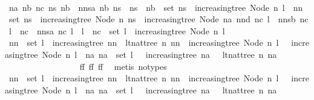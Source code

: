 \begin{isabellebody}
\ \ \ \ \ \ \ \ \ \ \ \ \isamarkupfalse%
\isanewline
\ \ \ \ \ \ \ \ \ \ \ \ \isacommand{{\isacharbraceleft}}\isamarkupfalse%
\ \isamarkupfalse%
\ {\isachardoublequoteopen}{\isasymexists}na\ nb\ nc\ ns{\isachardot}\ nb\ {\isacharhash}\ nnsa\ nb\ ns\ {\isasymnoteq}\ ns\ {\isasymand}\ nb\ {\isasymin}\ set\ ns\ {\isasymand}\ increasing{\isacharunderscore}tree\ {\isacharparenleft}Node\ n\ l{\isacharparenright}\ {\isasymand}\ nn\ {\isasymin}\ set\ ns\ {\isasymand}\ increasing{\isacharunderscore}tree\ {\isacharparenleft}Node\ n\ ns{\isacharparenright}\ {\isasymand}\ increasing{\isacharunderscore}tree\ {\isacharparenleft}Node\ na\ {\isacharparenleft}nnd\ nc\ l\ {\isacharhash}\ nnsb\ nc\ l{\isacharparenright}{\isacharparenright}\ {\isasymand}\ nc\ {\isacharhash}\ nnsa\ nc\ l\ {\isasymnoteq}\ l\ {\isasymand}\ nc\ {\isasymin}\ set\ l\ {\isasymand}\ increasing{\isacharunderscore}tree\ {\isacharparenleft}Node\ n\ l{\isacharparenright}{\isachardoublequoteclose}\isanewline
\ \ \ \ \ \ \ \ \ \ \ \ \ \ \isamarkupfalse%
\ \isamarkupfalse%
\ {\isachardoublequoteopen}{\isacharparenleft}nn\ {\isasymnotin}\ set\ l\ {\isasymor}\ increasing{\isacharunderscore}tree\ nn\ {\isasymand}\ lt{\isacharunderscore}nat{\isacharunderscore}tree\ n\ nn{\isacharparenright}\ {\isasymand}\ increasing{\isacharunderscore}tree\ {\isacharparenleft}Node\ n\ l{\isacharparenright}\ {\isasymor}\ {\isasymnot}\ increasing{\isacharunderscore}tree\ {\isacharparenleft}Node\ n\ l{\isacharparenright}\ {\isasymand}\ {\isacharparenleft}{\isasymexists}na{\isachardot}\ na\ {\isasymin}\ set\ l\ {\isasymand}\ {\isacharparenleft}{\isasymnot}\ increasing{\isacharunderscore}tree\ na\ {\isasymor}\ {\isasymnot}\ lt{\isacharunderscore}nat{\isacharunderscore}tree\ n\ na{\isacharparenright}{\isacharparenright}{\isachardoublequoteclose}\isanewline
\ \ \ \ \ \ \ \ \ \ \ \ \ \ \ \ \isamarkupfalse%
\ ff{}\ ff{}\ ff{}\ \isamarkupfalse%
\ {\isacharparenleft}metis\ {\isacharparenleft}no{\isacharunderscore}types{\isacharparenright}{\isacharparenright}\ \isacommand{{\isacharbraceright}}\isamarkupfalse%
\isanewline
\ \ \ \ \ \ \ \ \ \ \ \ \isamarkupfalse%
\ \isamarkupfalse%
\ {\isachardoublequoteopen}{\isacharparenleft}nn\ {\isasymnotin}\ set\ l\ {\isasymor}\ increasing{\isacharunderscore}tree\ nn\ {\isasymand}\ lt{\isacharunderscore}nat{\isacharunderscore}tree\ n\ nn{\isacharparenright}\ {\isasymand}\ increasing{\isacharunderscore}tree\ {\isacharparenleft}Node\ n\ l{\isacharparenright}\ {\isasymor}\ {\isasymnot}\ increasing{\isacharunderscore}tree\ {\isacharparenleft}Node\ n\ l{\isacharparenright}\ {\isasymand}\ {\isacharparenleft}{\isasymexists}na{\isachardot}\ na\ {\isasymin}\ set\ l\ {\isasymand}\ {\isacharparenleft}{\isasymnot}\ increasing{\isacharunderscore}tree\ na\ {\isasymor}\ {\isasymnot}\ lt{\isacharunderscore}nat{\isacharunderscore}tree\ n\ na{\isacharparenright}{\isacharparenright}{\isachardoublequoteclose}\isanewline

\end{isabellebody}
